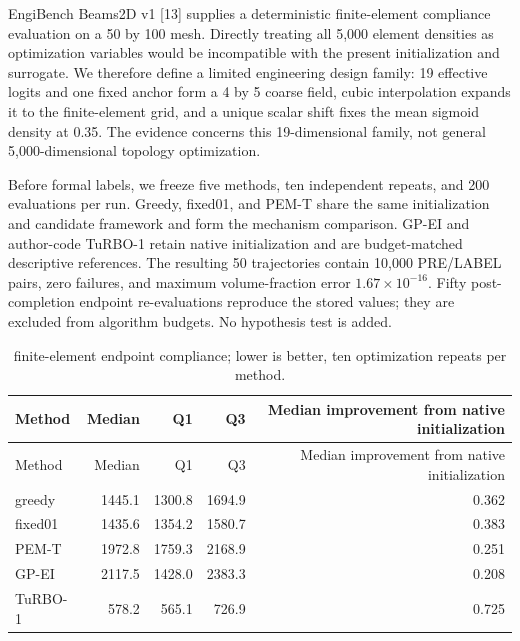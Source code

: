\documentclass[11pt,a4paper]{article}
\begin{document}
EngiBench Beams2D v1 {[}13{]} supplies a deterministic finite-element
compliance evaluation on a 50 by 100 mesh. Directly treating all 5,000
element densities as optimization variables would be incompatible with
the present initialization and surrogate. We therefore define a limited
engineering design family: 19 effective logits and one fixed anchor form
a 4 by 5 coarse field, cubic interpolation expands it to the
finite-element grid, and a unique scalar shift fixes the mean sigmoid
density at 0.35. The evidence concerns this 19-dimensional family, not
general 5,000-dimensional topology optimization.

Before formal labels, we freeze five methods, ten independent repeats,
and 200 evaluations per run. Greedy, fixed01, and PEM-T share the same
initialization and candidate framework and form the mechanism
comparison. GP-EI and author-code TuRBO-1 retain native initialization
and are budget-matched descriptive references. The resulting 50
trajectories contain 10,000 PRE/LABEL pairs, zero failures, and maximum
volume-fraction error \(1.67\times10^{-16}\). Fifty post-completion
endpoint re-evaluations reproduce the stored values; they are excluded
from algorithm budgets. No hypothesis test is added.

\par\noindent\begin{minipage}{\linewidth}

\begin{longtable}[]{@{}lrrrr@{}}
\caption{finite-element endpoint compliance; lower is better, ten
optimization repeats per method.}\tabularnewline
\toprule
Method & Median & Q1 & Q3 & Median improvement from native
initialization \\
\midrule
\endfirsthead
\toprule
Method & Median & Q1 & Q3 & Median improvement from native
initialization \\
\midrule
\endhead
greedy & 1445.1 & 1300.8 & 1694.9 & 0.362 \\
fixed01 & 1435.6 & 1354.2 & 1580.7 & 0.383 \\
PEM-T & 1972.8 & 1759.3 & 2168.9 & 0.251 \\
GP-EI & 2117.5 & 1428.0 & 2383.3 & 0.208 \\
TuRBO-1 & 578.2 & 565.1 & 726.9 & 0.725 \\
\bottomrule
\end{longtable}

\end{minipage}\par
\end{document}
